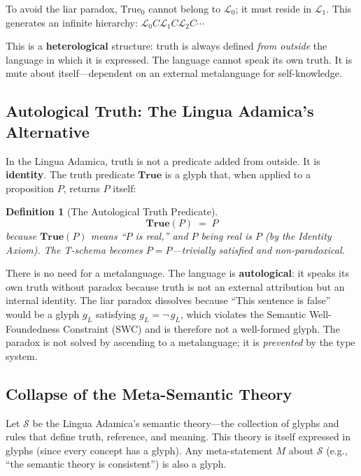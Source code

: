 \documentclass[12pt, letterpaper]{book}
\def\equiv{=}%
\def\subset{C}%
\def\mathfrak#1{#1}%
\newtheorem{definition}{Definition}[chapter]
\begin{document}
To avoid the liar paradox, $\mathrm{True}_0$ cannot belong to $\mathcal{L}_0$; it must reside in $\mathcal{L}_1$. This generates an infinite hierarchy: $\mathcal{L}_0 \subset \mathcal{L}_1 \subset \mathcal{L}_2 \subset \cdots$

This is a \textbf{heterological} structure: truth is always defined \textit{from outside} the language in which it is expressed. The language cannot speak its own truth. It is mute about itself---dependent on an external metalanguage for self-knowledge.

\subsection{Autological Truth: The Lingua Adamica's Alternative}

In the Lingua Adamica, truth is not a predicate added from outside. It is \textbf{identity}. The truth predicate $\mathbf{True}$ is a glyph that, when applied to a proposition $P$, returns $P$ itself:

\begin{definition}[The Autological Truth Predicate]\label{def:auto-truth}
\[
\mathbf{True}(P) \;\equiv\; P
\]
because $\mathbf{True}(P)$ means ``$P$ is real,'' and $P$ being real \textit{is} $P$ (by the Identity Axiom). The T-schema becomes $P \equiv P$---trivially satisfied and non-paradoxical.
\end{definition}

There is no need for a metalanguage. The language is \textbf{autological}: it speaks its own truth without paradox because truth is not an external attribution but an internal identity. The liar paradox dissolves because ``This sentence is false'' would be a glyph $\mathfrak{g}_L$ satisfying $\mathfrak{g}_L \equiv \neg\, \mathfrak{g}_L$, which violates the Semantic Well-Foundedness Constraint (SWC) and is therefore not a well-formed glyph. The paradox is not solved by ascending to a metalanguage; it is \textit{prevented} by the type system.

\subsection{Collapse of the Meta-Semantic Theory}

Let $\mathcal{S}$ be the Lingua Adamica's semantic theory---the collection of glyphs and rules that define truth, reference, and meaning. This theory is itself expressed in glyphs (since every concept has a glyph). Any meta-statement $M$ about $\mathcal{S}$ (e.g., ``the semantic theory is consistent'') is also a glyph.
\end{document}
